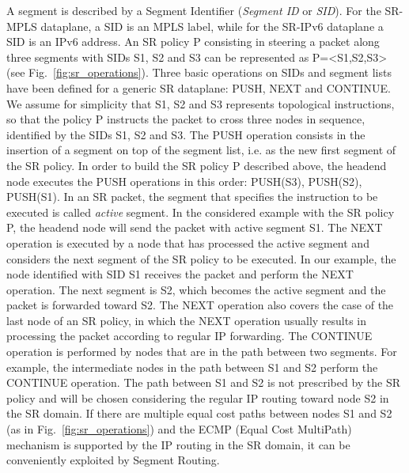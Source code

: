 A segment is described by a Segment Identifier (\textit{Segment ID} or \textit{SID}). For the SR-MPLS dataplane, a SID is an MPLS label, while for the SR-IPv6 dataplane a SID is an IPv6 address. An SR policy P consisting in steering a packet along three segments with SIDs S1, S2 and S3 can be represented as P=<S1,S2,S3> (see Fig.~\ref{fig:sr_operations}). Three basic operations on SIDs and segment lists have been defined for a generic SR dataplane: PUSH, NEXT and CONTINUE. We assume for simplicity that S1, S2 and S3 represents topological instructions, so that the policy P instructs the packet to cross three nodes in sequence, identified by the SIDs S1, S2 and S3. 
The PUSH operation consists in the insertion of a segment on top of the segment list, i.e. as the new first segment of the SR policy. In order to build the SR policy P described above, the headend node executes the PUSH operations in this order: PUSH(S3), PUSH(S2), PUSH(S1). In an SR packet, the segment that specifies the instruction to be executed is called \textit{active} segment. In the considered example with the SR policy P, the headend node will send the packet with active segment S1. The NEXT operation is executed by a node that has processed the active segment and considers the next segment of the SR policy to be executed. In our example, the node identified with SID S1 receives the packet and perform the NEXT operation. The next segment is S2, which becomes the active segment and the packet is forwarded toward S2. The NEXT operation also covers the case of the last node of an SR policy, in which the NEXT operation usually results in processing the packet according to regular IP forwarding. The CONTINUE operation is performed by nodes that are in the path between two segments. For example, the intermediate nodes in the path between S1 and S2 perform the CONTINUE operation. The path between S1 and S2 is not prescribed by the SR policy and will be chosen considering the regular IP routing toward node S2 in the SR domain. If there are multiple equal cost paths between nodes S1 and S2 (as in Fig.~\ref{fig:sr_operations}) and the ECMP (Equal Cost MultiPath) mechanism is supported by the IP routing in the SR domain, it can be conveniently exploited by Segment Routing. 

